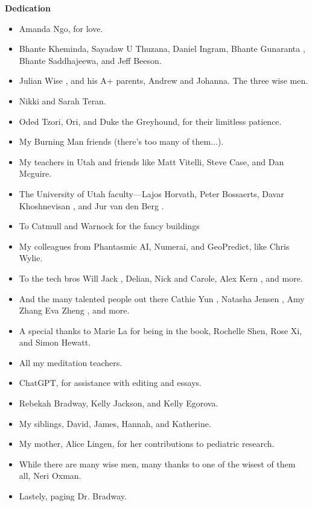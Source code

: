 \begin{titlepage}
    \centering
    {\Huge \bfseries Dedication}\par
    \vspace{2cm}
    \begin{itemize}
        \item Amanda Ngo, for love. \cite{gafori} \cite{bradway} \cite{green}
        \item Bhante Kheminda, Sayadaw U Thuzana, Daniel Ingram, Bhante Gunaranta \cite{guna} \cite{bhavana}, Bhante Saddhajeewa, and Jeff Beeson.
        \item Julian Wise \cite{yale}, and his A+ parents, Andrew and Johanna. The three wise men.
        \item Nikki and Sarah Teran.
        \item Oded Tzori, Ori, and Duke the Greyhound, for their limitless patience.
        \item My Burning Man friends (there's too many of them...).
        \item My teachers in Utah and friends like Matt Vitelli, Steve Case, and Dan Mcguire.
        \item The University of Utah faculty—Lajos Horvath, Peter Bossaerts, Davar Khoshnevisan \cite{davar}, and Jur van den Berg \cite{utah}.
        \item To Catmull and Warnock for the fancy buildings \cite{utah}
        \item My colleagues from Phantasmic AI, Numerai, and GeoPredict, like Chris Wylie.
        \item To the tech bros Will Jack \cite{mit}, Delian, Nick and Carole, Alex Kern \cite{berkeley}, and more.
        \item And the many talented people out there Cathie Yun \cite{mit}, Natasha Jensen \cite{mit}, Amy Zhang \cite{mit} Eva Zheng \cite{berkeley}, and more.
        \item A special thanks to Marie La for being in the book, Rochelle Shen, Rose Xi, and Simon Hewatt.
        \item All my meditation teachers.
        \item ChatGPT, for assistance with editing and essays.
        \item Rebekah Bradway, Kelly Jackson, and Kelly Egorova.
        \item My siblings, David, James, Hannah, and Katherine.
        \item My mother, Alice Lingen, for her contributions to pediatric research.
        \item While there are many wise men, many thanks to one of the wisest of them all, Neri Oxman.
        \item Lastely, paging Dr. Bradway.
    \end{itemize}
    \vfill
\end{titlepage}
